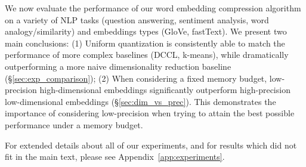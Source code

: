 We now evaluate the performance of our word embedding compression algorithm on a variety of NLP tasks (question answering, sentiment analysis, word analogy/similarity) and embeddings types (GloVe, fastText).
We present two main conclusions:
(1) Uniform quantization is consistently able to match the performance of more complex baselines (DCCL, k-means), while dramatically outperforming a more naive dimensionality reduction baseline (\S\ref{sec:exp_comparison});
(2) When considering a fixed memory budget, low-precision high-dimensional embeddings significantly outperform high-precision low-dimensional embeddings (\S\ref{sec:dim_vs_prec}).
This demonstrates the importance of considering low-precision when trying to attain the best possible performance under a memory budget.

For extended details about all of our experiments, and for results which did not fit in the main text, please see Appendix~\ref{app:experiments}.

